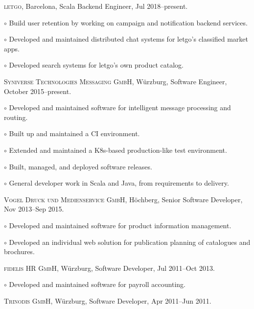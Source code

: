 \documentclass[letterpaper]{article}
\renewenvironment{itemize}{
  \begin{list}{}{
    \setlength{\leftmargin}{1.5em}
  }
}{
  \end{list}
}
\newenvironment{no-indent-itemize}{
  \begin{list}{}{
    \setlength{\leftmargin}{0em}
  }
}{
  \end{list}
}
\def\bullet{$\circ$\xspace}
\begin{document}
\begin{no-indent-itemize}
  \item \textsc{letgo}, Barcelona, Scala Backend Engineer, Jul 2018--present.
  \begin{itemize}
    \item\bullet Build user retention by working on campaign and notification backend services.
    \item\bullet Developed and maintained distributed chat systems for letgo's classified market apps.
    \item\bullet Developed search systems for letgo's own product catalog.
  \end{itemize}
  \item \textsc{Syniverse Technologies Messaging GmbH}, Würzburg, Software Engineer, October 2015--present.
  \begin{itemize}
    \item\bullet Developed and maintained software for intelligent message processing and routing.
    \item\bullet Built up and maintained a CI environment.
    \item\bullet Extended and maintained a K8s-based production-like test environment.
    \item\bullet Built, managed, and deployed software releases.
    \item\bullet General developer work in Scala and Java, from requirements to delivery.
  \end{itemize}
  \item \textsc{Vogel Druck und Medienservice GmbH}, Höchberg, Senior Software Developer, Nov 2013--Sep 2015.
  \begin{itemize}
    \item\bullet Developed and maintained software for product information management.
    \item\bullet Developed an individual web solution for publication planning of catalogues and brochures.
  \end{itemize}
  \item \textsc{fidelis HR GmbH}, Würzburg, Software Developer, Jul 2011--Oct 2013. 
  \begin{itemize}
    \item\bullet Developed and maintained software for payroll accounting.
  \end{itemize}
  \item \textsc{Trinodis GmbH}, Würzburg, Software Developer, Apr 2011--Jun 2011. 
  \begin{itemize}

\end{itemize}
\end{no-indent-itemize}
\end{document}
